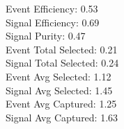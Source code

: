 Event  Efficiency:     0.53\\
Signal Efficiency:     0.69\\
Signal Purity:         0.47\\
Event  Total Selected: 0.21\\
Signal Total Selected: 0.24\\
Event  Avg Selected:   1.12\\
Signal Avg Selected:   1.45\\
Event  Avg Captured:   1.25\\
Signal Avg Captured:   1.63